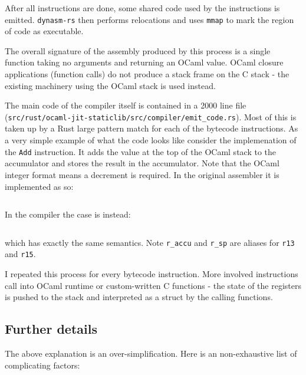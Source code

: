 After all instructions are done, some shared code used by the instructions is emitted.
\texttt{dynasm-rs} then performs relocations and uses \texttt{mmap} to mark the region of code as
executable.

The overall signature of the assembly produced by this process is a single function taking no
arguments and returning an OCaml value. OCaml closure applications (function calls) do not produce
a stack frame on the C stack - the existing machinery using the OCaml stack is used instead.

The main code of the compiler itself is contained in a 2000 line file
(\texttt{src/rust/ocaml-jit-staticlib/src/compiler/emit\_code.rs}). Most of this is taken up by a
Rust large pattern match for each of the bytecode instructions. As a very simple example of what
the code looks like consider the implemenation of the \texttt{Add} instruction. It adds the value
at the top of the OCaml stack to the accumulator and stores the result in the accumulator. Note
that the OCaml integer format means a decrement is required. In the original assembler it is
implemented as so:

\inputminted{c}{snippets/add.c}

In the compiler the case is instead:

\inputminted{rust}{snippets/add.rs}

which has exactly the same semantics. Note \texttt{r\_accu} and \texttt{r\_sp}
are aliases for \texttt{r13} and \texttt{r15}.

I repeated this process for every bytecode instruction. More involved instructions call into
OCaml runtime or custom-written C functions - the state of the registers is pushed to the stack
and interpreted as a struct by the calling functions.

\subsection{Further details}

The above explanation is an over-simplification. Here is an non-exhaustive list of complicating
factors:

